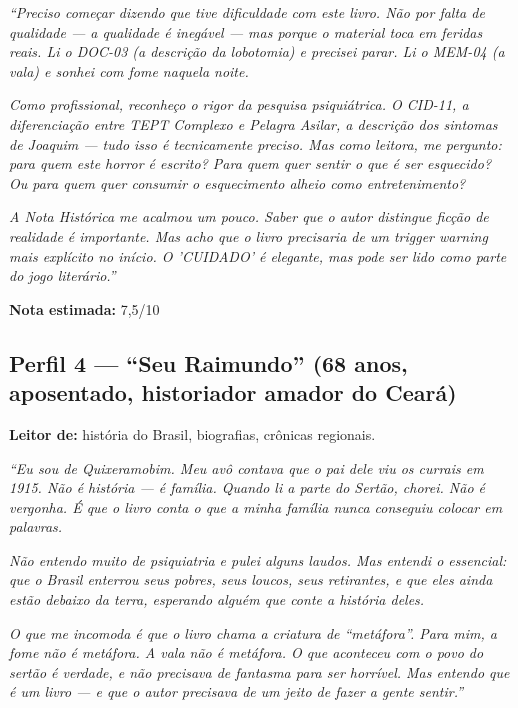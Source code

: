 \documentclass[14pt,openany]{extbook}
\begin{document}
\vspace{0.3em}
\noindent\textit{``Preciso começar dizendo que tive dificuldade com este livro. Não por falta de qualidade --- a qualidade é inegável --- mas porque o material toca em feridas reais. Li o DOC-03 (a descrição da lobotomia) e precisei parar. Li o MEM-04 (a vala) e sonhei com fome naquela noite.}

\vspace{0.3em}
\noindent\textit{Como profissional, reconheço o rigor da pesquisa psiquiátrica. O CID-11, a diferenciação entre TEPT Complexo e Pelagra Asilar, a descrição dos sintomas de Joaquim --- tudo isso é tecnicamente preciso. Mas como leitora, me pergunto: para quem este horror é escrito? Para quem quer sentir o que é ser esquecido? Ou para quem quer consumir o esquecimento alheio como entretenimento?}

\vspace{0.3em}
\noindent\textit{A Nota Histórica me acalmou um pouco. Saber que o autor distingue ficção de realidade é importante. Mas acho que o livro precisaria de um trigger warning mais explícito no início. O 'CUIDADO' é elegante, mas pode ser lido como parte do jogo literário.''}

\vspace{0.3em}
\noindent\textbf{Nota estimada:} 7,5/10

\vspace{0.8em}

\subsection*{Perfil 4 --- ``Seu Raimundo'' (68 anos, aposentado, historiador amador do Ceará)}

\textbf{Leitor de:} história do Brasil, biografias, crônicas regionais.

\vspace{0.3em}
\noindent\textit{``Eu sou de Quixeramobim. Meu avô contava que o pai dele viu os currais em 1915. Não é história --- é família. Quando li a parte do Sertão, chorei. Não é vergonha. É que o livro conta o que a minha família nunca conseguiu colocar em palavras.}

\vspace{0.3em}
\noindent\textit{Não entendo muito de psiquiatria e pulei alguns laudos. Mas entendi o essencial: que o Brasil enterrou seus pobres, seus loucos, seus retirantes, e que eles ainda estão debaixo da terra, esperando alguém que conte a história deles.}

\vspace{0.3em}
\noindent\textit{O que me incomoda é que o livro chama a criatura de ``metáfora''. Para mim, a fome não é metáfora. A vala não é metáfora. O que aconteceu com o povo do sertão é verdade, e não precisava de fantasma para ser horrível. Mas entendo que é um livro --- e que o autor precisava de um jeito de fazer a gente sentir.''}
\end{document}
